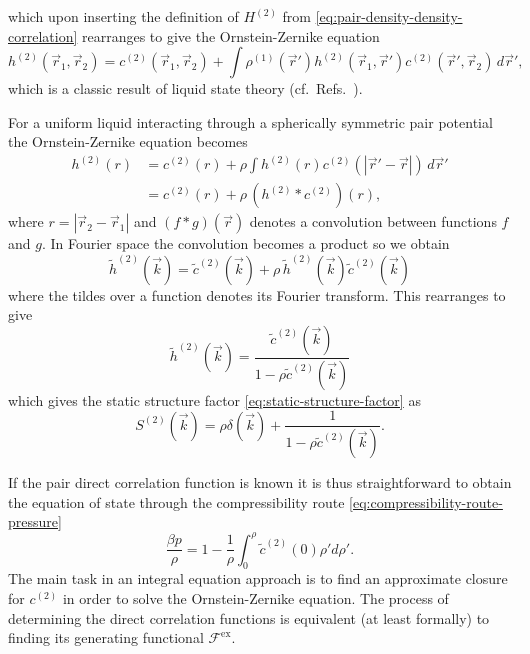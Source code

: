 which upon inserting the definition of $H^{(2)}$ from \eqref{eq:pair-density-density-correlation} rearranges to give the Ornstein-Zernike equation
\begin{equation}\label{eq:ornstein-zernike-generic}
  h^{(2)}(\vec{r}_1, \vec{r}_2) =
  c^{(2)}(\vec{r}_1, \vec{r}_2) +
  \int
  \rho^{(1)}(\vec{r}')
  h^{(2)}(\vec{r}_1, \vec{r}')
  c^{(2)}(\vec{r}', \vec{r}_2)
  \, d\vec{r}',
\end{equation}
which is a classic result of liquid state theory (cf.\ Refs.\ \cite{OrnsteinPAS1914,Hansen2013,EvansAP1979}).

\begin{tcolorbox}[title=Ornstein-Zernike equation for a uniform simple liquid]
For a uniform liquid interacting through a spherically symmetric pair potential the Ornstein-Zernike equation becomes
\begin{equation}\label{eq:ornstein-zernike-spherical}
  \begin{split}
    h^{(2)}(r)
    &=
    c^{(2)}(r) +
    \rho
    \int
    h^{(2)}(r)
    c^{(2)}(|\vec{r}' - \vec{r}|)
    \, d\vec{r}'
    \\ &=
    c^{(2)}(r) + \rho \, (h^{(2)} * c^{(2)})(r),
  \end{split}
\end{equation}
where $r = |\vec{r}_2 - \vec{r}_1|$ and $(f*g)(\vec{r})$ denotes a convolution between functions $f$ and $g$.
In Fourier space the convolution becomes a product so we obtain
\begin{equation*}
  \tilde{h}^{(2)}(\vec{k})
  =
  \tilde{c}^{(2)}(\vec{k}) +
  \rho \, \tilde{h}^{(2)}(\vec{k}) \tilde{c}^{(2)}(\vec{k})
\end{equation*}
where the tildes over a function denotes its Fourier transform.
This rearranges to give
\begin{equation*}
  \tilde{h}^{(2)}(\vec{k})
  =
  \frac{\tilde{c}^{(2)}(\vec{k})}{1 - \rho \tilde{c}^{(2)}(\vec{k})}
\end{equation*}
which gives the static structure factor \eqref{eq:static-structure-factor} as
\begin{equation*}
  S^{(2)}(\vec{k})
  =
  \rho \delta(\vec{k}) +
  \frac{1}{1 - \rho \tilde{c}^{(2)}(\vec{k})}.
\end{equation*}
\end{tcolorbox}

If the pair direct correlation function is known it is thus straightforward to obtain the equation of state through the compressibility route \eqref{eq:compressibility-route-pressure}
\begin{equation*}
  \frac{\beta p}{\rho}
  =
  1 - \frac{1}{\rho} \int_0^\rho \tilde{c}^{(2)}(0) \rho' d\rho'.
\end{equation*}
The main task in an integral equation approach is to find an approximate closure for $c^{(2)}$ in order to solve the Ornstein-Zernike equation.
The process of determining the direct correlation functions is equivalent (at least formally) to finding its generating functional $\mathcal{F}^\mathrm{ex}$.


